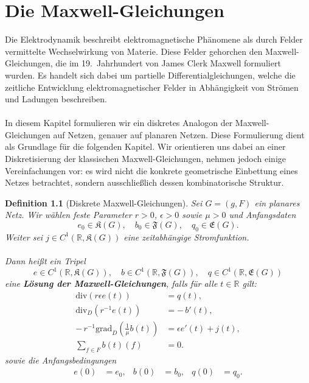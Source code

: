 \documentclass[11pt,a4paper,leqno]{report}
\newtheorem{definition}[theorem]{Definition}
\numberwithin{equation}{chapter}
\begin{document}
\chapter{Die Maxwell-Gleichungen}
Die Elektrodynamik beschreibt elektromagnetische Phänomene als durch Felder vermittelte Wechselwirkung von Materie. 
Diese Felder gehorchen den Maxwell-Gleichungen, die im 19.~Jahrhundert von James Clerk Maxwell formuliert wurden. 
Es handelt sich dabei um partielle Differentialgleichungen, welche die zeitliche Entwicklung elektromagnetischer Felder in Abhängigkeit von Strömen und Ladungen beschreiben. \\
\\
In diesem Kapitel formulieren wir ein diskretes Analogon der Maxwell-Gleichungen auf Netzen, 
genauer auf planaren Netzen. Diese Formulierung dient als Grundlage für die folgenden Kapitel.  
Wir orientieren uns dabei an einer Diskretisierung der klassischen Maxwell-Gleichungen, 
nehmen jedoch einige Vereinfachungen vor: es wird nicht die konkrete geometrische Einbettung 
eines Netzes betrachtet, sondern ausschließlich dessen kombinatorische Struktur.
\begin{definition}[Diskrete Maxwell-Gleichungen]
	Sei $G=(g,F)$ ein planares Netz.  
	Wir wählen feste Parameter $r>0$, $\epsilon>0$ sowie $\mu>0$ und Anfangsdaten
	\[
	e_0 \in \mathfrak{K}(G), 
	\quad b_0 \in \mathfrak{F}(G), 
	\quad q_0 \in \mathfrak{E}(G).
	\]
	Weiter sei $j \in C^1(\mathbb{R}, \mathfrak{K}(G))$ eine zeitabhängige Stromfunktion.\\  
	\\
	Dann heißt ein Tripel
	\[
	e \in C^1(\mathbb{R},\mathfrak{K}(G)), 
	\quad b \in C^1(\mathbb{R},\mathfrak{F}(G)), 
	\quad q \in C^1(\mathbb{R},\mathfrak{E}(G))
	\]
	eine \textbf{Lösung der Maxwell-Gleichungen}, falls für alle $t\in\mathbb{R}$ gilt:
	\begin{align}
		\mathrm{div}(r\epsilon e(t)) &= q(t), \label{eq:disk-gauss}\\
		\mathrm{div}_D(r^{-1} e(t)) &= -\, b'(t), \label{eq:disk-faraday}\\
		-\,r^{-1}\mathrm{grad}_D\!\left(\tfrac{1}{\mu} b(t)\right) &= \epsilon e'(t) + j(t), \label{eq:disk-ampere}\\
		\sum_{f\in F} b(t)(f) &= 0. \label{eq:disk-magnetgauss}
	\end{align}
	sowie die Anfangsbedingungen
	\begin{align}
		e(0) &= e_0, &
		b(0) &= b_0, &
		q(0) &= q_0.
	\end{align}
\end{definition}
\end{document}
